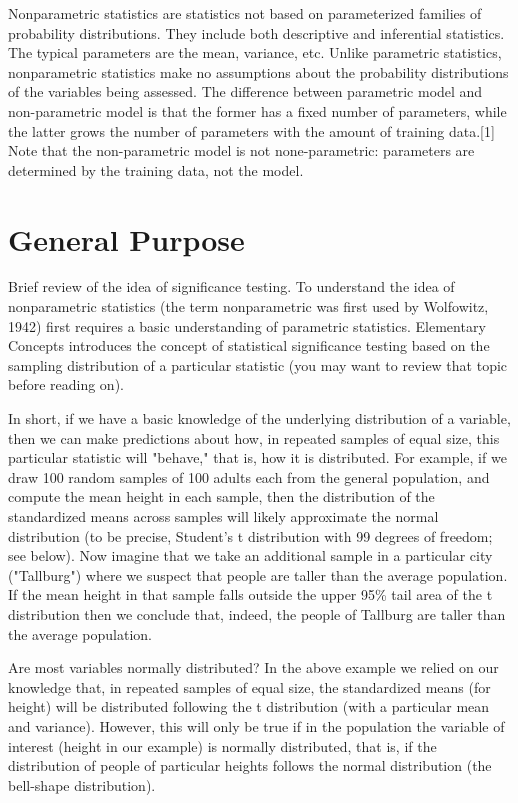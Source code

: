Nonparametric statistics are statistics not based on parameterized families of probability distributions. They include both descriptive and inferential statistics. The typical parameters are the mean, variance, etc. Unlike parametric statistics, nonparametric statistics make no assumptions about the probability distributions of the variables being assessed. The difference between parametric model and non-parametric model is that the former has a fixed number of parameters, while the latter grows the number of parameters with the amount of training data.[1] Note that the non-parametric model is not none-parametric: parameters are determined by the training data, not the model.

\section*{General Purpose}

Brief review of the idea of significance testing. To understand the idea of nonparametric statistics (the 
term nonparametric was first used by Wolfowitz, 1942) first requires a basic understanding of parametric 
statistics. Elementary Concepts introduces the concept of statistical significance testing based on the 
sampling distribution of a particular statistic (you may want to review that topic before reading on). 

In short, if we have a basic knowledge of the underlying distribution of a variable, then we can make 
predictions about how, in repeated samples of equal size, this particular statistic will "behave," that is, 
how it is distributed. For example, if we draw 100 random samples of 100 adults each from the general 
population, and compute the mean height in each sample, then the distribution of the standardized 
means across samples will likely approximate the normal distribution (to be precise, Student's t distribution 
with 99 degrees of freedom; see below). Now imagine that we take an additional sample in a particular 
city ("Tallburg") where we suspect that people are taller than the average population. 
If the mean height in that sample falls outside the upper 95\% tail area of the t distribution then we conclude that, indeed, the people of Tallburg are taller than the average population.

Are most variables normally distributed? In the above example we relied on our knowledge that, in repeated samples of 
equal size, the standardized means (for height) will be distributed following the t distribution (with a particular 
mean and variance). However, this will only be true if in the population the variable of interest (height in our example) 
is normally distributed, that is, if the distribution of people of particular heights follows the normal distribution 
(the bell-shape distribution).

